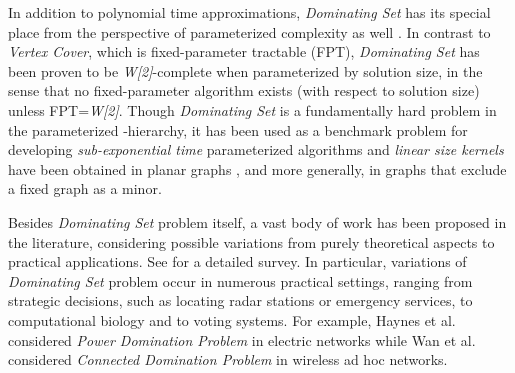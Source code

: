 \documentclass[a4paper,11pt]{article}
\theoremstyle{definition}
\begin{document}
\smallskip

In addition to polynomial time approximations, {\em Dominating
Set} has its special place from the perspective of parameterized complexity as well \cite{RGDMRF99,JFMG06,RN06}. In
contrast to {\em Vertex Cover}, which is fixed-parameter tractable (FPT),
{\em Dominating Set} has been proven to be {\it W[2]}-complete when
parameterized by solution size, in the sense that no fixed-parameter
algorithm exists (with respect to solution size) unless FPT={\it W[2]}. Though {\em Dominating Set} is a fundamentally hard problem in the parameterized -hierarchy, it has been used as a benchmark problem for developing {\it sub-exponential time} parameterized algorithms \cite{JAHLBHFTKRN02,1101823,1139978} and 
{\it linear size kernels} have been obtained in planar graphs \cite{990309,JFMG06,DBLP:conf/icalp/GuoN07,RN06}, and more generally, in graphs that exclude a fixed graph  as a minor.

\smallskip

Besides {\em Dominating Set} problem itself, a vast body of
work has been proposed in the literature, considering possible variations from purely theoretical aspects to practical applications. See \cite{TWHSHPS98,FSR78} for a detailed survey. In particular, variations of {\em Dominating Set} problem occur in numerous practical settings, ranging from strategic decisions, such as locating radar stations or emergency services, to computational biology and to voting systems. For example, Haynes et al. \cite{587927} considered {\em Power Domination Problem} in electric networks \cite{587927,DBLP:conf/cocoon/LiaoL05} while Wan et al. \cite{PJWKMAOF03} considered {\em Connected Domination Problem} in wireless ad hoc networks.

\smallskip
\end{document}
